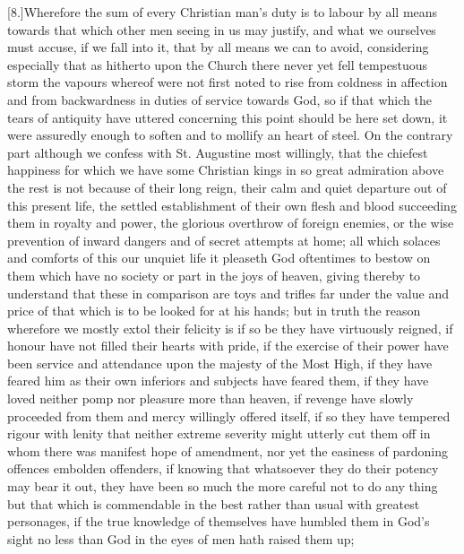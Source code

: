 [8.]Wherefore the sum of every Christian man’s duty is to labour by all means towards that which other men seeing in us may justify, and what we ourselves must accuse, if we fall into it, that by all means we can to avoid, considering especially that as hitherto upon the Church there never yet fell tempestuous storm the vapours whereof were not first noted to rise from coldness in affection and from backwardness in duties of service towards God, so if that which the tears of antiquity have uttered concerning this point should be here set down, it were assuredly enough to soften and to mollify an heart of steel. On the contrary part although we confess with St. Augustine most willingly, that the chiefest happiness  for which we have some Christian kings in so great admiration above the rest is not because of their long reign, their calm and quiet departure out of this present life, the settled establishment of their own flesh and blood succeeding them in royalty and power, the glorious overthrow of foreign enemies, or the wise prevention of inward dangers and of secret attempts at home; all which solaces and comforts of this our unquiet life it pleaseth God oftentimes to bestow on them which have no society or part in the joys of heaven, giving thereby to understand that these in comparison are toys and trifles far under the value and price of that which is to be looked for at his hands; but in truth the reason wherefore we mostly extol their felicity is if so be they have virtuously reigned, if honour have not filled their hearts with pride, if the exercise of their power have been service and attendance upon the majesty of the Most High, if they have feared him as their own inferiors and subjects have feared them, if they have loved neither pomp nor pleasure more than heaven, if revenge have slowly proceeded from them and mercy willingly offered itself, if so they have tempered rigour with lenity that neither extreme severity might utterly cut them off in whom there was manifest hope of amendment, nor yet the easiness of pardoning offences embolden offenders, if knowing that whatsoever they do their potency may bear it out, they have been so much the more careful not to do any thing but that which is commendable in the best rather than usual with greatest personages, if the true knowledge of themselves have  humbled them in God’s sight no less than God in the eyes of men hath raised them up;
